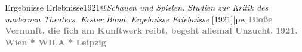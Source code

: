 \begin{ledgroupsized}[t]{13cm}
{{{                  Ergebnisse Erlebnisse1921@\strich\emph{Schauen und Spielen. Studien zur Kritik des modernen Theaters. Erster Band. Ergebnisse Erlebnisse} {[}1921{]}|pw}}}\pend
           {\bigskip}\pstart
           \noindent{}\raggedleft{}\textcolor{gray}{\textbf{Bloße Vernunft, die ſich am Kunſtwerk}}\pend
           \pstart
           \noindent{}\raggedleft{}\textcolor{gray}{\textbf{reibt, begeht allemal Unzucht.}}\pend
           {\bigskip}\pstart
           \noindent{}\centering{}\textcolor{gray}{\textbf{1921. }}\pend
           \pstart
           \noindent{}\centering{}\textcolor{gray}{\textbf{Wien * WILA * Leipzig}}\pend
           
         
         \endnumbering{}\end{ledgroupsized}\begin{anhang}\end{anhang}\newcommand{\dateiname}{L03051}\newcommand{\titel}{Felix Salten: Widmungsexemplar Schauen und Spielen für Arthur Schnitzler, 22. 9. 1921}\newcommand{\editorInnen}{Martin Anton Müller und Laura Untner}
      